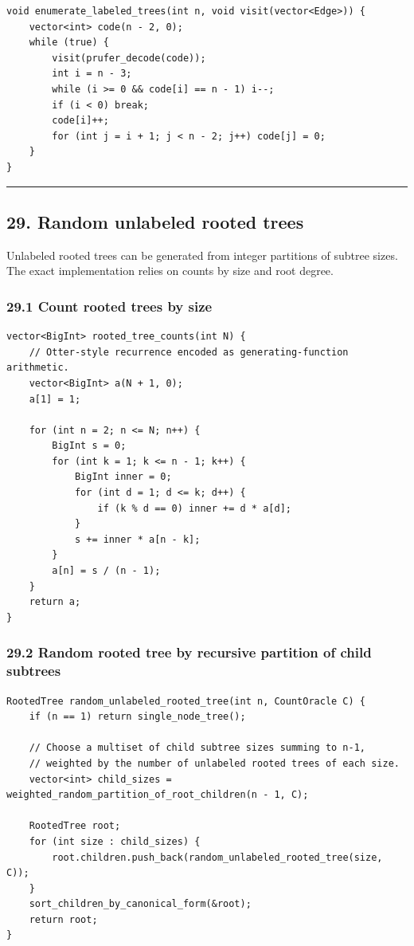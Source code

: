 \documentclass[11pt]{article}
\begin{document}
\begin{verbatim}
void enumerate_labeled_trees(int n, void visit(vector<Edge>)) {
    vector<int> code(n - 2, 0);
    while (true) {
        visit(prufer_decode(code));
        int i = n - 3;
        while (i >= 0 && code[i] == n - 1) i--;
        if (i < 0) break;
        code[i]++;
        for (int j = i + 1; j < n - 2; j++) code[j] = 0;
    }
}
\end{verbatim}

\begin{center}\rule{0.5\linewidth}{0.5pt}\end{center}

\subsection{29. Random unlabeled rooted trees}\label{random-unlabeled-rooted-trees}

Unlabeled rooted trees can be generated from integer partitions of subtree sizes. The exact implementation relies on counts by size and root degree.

\subsubsection{29.1 Count rooted trees by size}\label{count-rooted-trees-by-size}

\begin{verbatim}
vector<BigInt> rooted_tree_counts(int N) {
    // Otter-style recurrence encoded as generating-function arithmetic.
    vector<BigInt> a(N + 1, 0);
    a[1] = 1;

    for (int n = 2; n <= N; n++) {
        BigInt s = 0;
        for (int k = 1; k <= n - 1; k++) {
            BigInt inner = 0;
            for (int d = 1; d <= k; d++) {
                if (k % d == 0) inner += d * a[d];
            }
            s += inner * a[n - k];
        }
        a[n] = s / (n - 1);
    }
    return a;
}
\end{verbatim}

\subsubsection{29.2 Random rooted tree by recursive partition of child subtrees}\label{random-rooted-tree-by-recursive-partition-of-child-subtrees}

\begin{verbatim}
RootedTree random_unlabeled_rooted_tree(int n, CountOracle C) {
    if (n == 1) return single_node_tree();

    // Choose a multiset of child subtree sizes summing to n-1,
    // weighted by the number of unlabeled rooted trees of each size.
    vector<int> child_sizes = weighted_random_partition_of_root_children(n - 1, C);

    RootedTree root;
    for (int size : child_sizes) {
        root.children.push_back(random_unlabeled_rooted_tree(size, C));
    }
    sort_children_by_canonical_form(&root);
    return root;
}
\end{verbatim}
\end{document}
